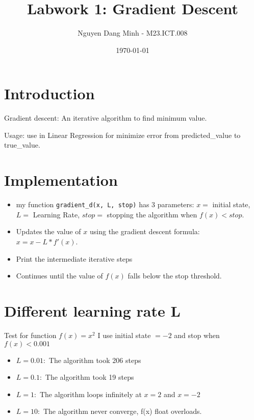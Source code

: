 \documentclass{article}
\title{Labwork 1: Gradient Descent}
\author{Nguyen Dang Minh - M23.ICT.008}
\date{\today}
\begin{document}
\maketitle

\section{Introduction}
Gradient descent: An iterative algorithm to find minimum value.

Usage: use in Linear Regression for minimize error from predicted_value to true_value.

\section{Implementation}
\begin{itemize}
\item my function \texttt{gradient\_d(x, L, stop)} has 3 parameters: $x = $ initial state, $L =$ Learning Rate, $stop =$ stopping the algorithm when $f(x)<stop$. 


\item Updates the value of $x$ using the gradient descent formula: $x = x - L * f'(x)$.


\item Print the intermediate iterative steps


\item Continues until the value of $f(x)$ falls below the stop threshold.
\end{itemize}
\section{Different learning rate L}
Test for function $f(x) = x^2$
I use initial state $= -2$ and stop when $f(x) < 0.001$

\begin{itemize}
    \item \textbf{$L = 0.01:$} The algorithm took 206 steps
    \item \textbf{$L = 0.1:$} The algorithm took 19 steps    
    \item \textbf{$L = 1:$} The algorithm loops infinitely at $x=2$ and $x=-2$
    \item \textbf{$L = 10:$} The algorithm never converge, f(x) float overloads.
\end{itemize}
\end{document}
